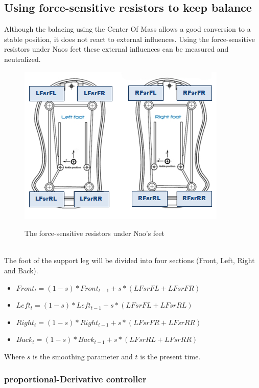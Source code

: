 \documentclass[a4paper]{article}
\begin{document}
\subsection{Using force-sensitive resistors to keep balance}

Although the balacing using the Center Of Mass allows a good conversion to a
stable position, it does not react to external influences.
Using the force-sensitive resistors under Naos feet these external influences can be measured and neutralized.
\begin{figure}[htb]
	\centering
	\includegraphics[scale=0.75]{pics/naosfeet.jpg}
	\label{fig:fsr_plot}
	\caption{The force-sensitive resistors under Nao's feet}
\end{figure}\\
The foot of the support leg will be divided into four sections (Front, Left, Right and Back). 
\begin{itemize}
    \item $Front_t = (1-s) * Front_{t-1} + s * (LFsrFL + LFsrFR)$
    \item $Left_t = (1-s) * Left_{t-1} + s *(LFsrFL + LFsrRL)$
    \item $Right_t = (1-s) * Right_{t-1} + s *(LFsrFR + LFsrRR)$
    \item $Back_t = (1-s) * Back_{t-1} + s *(LFsrRL + LFsrRR)$ 
\end{itemize}
Where $s$ is the smoothing parameter and $t$ is the present time.

\subsubsection{proportional-Derivative controller}
\end{document}
